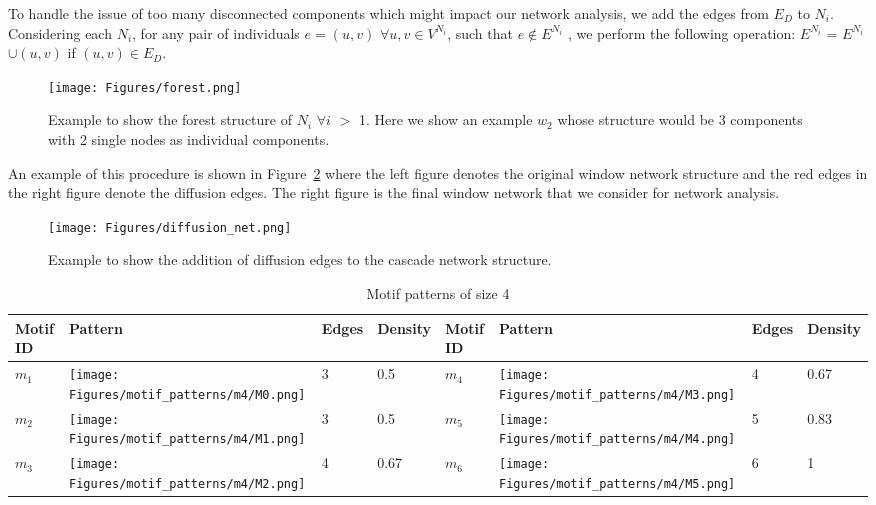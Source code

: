\documentclass[smallextended]{svjour3}       %
\theoremstyle{definition}
\begin{document}
To handle the issue of too many disconnected components which might impact our network analysis, we add the edges from $E_D$ to $N_i$. Considering each $N_i $, for any pair of individuals $e = (u, v)$  $\forall u, v \in V^{N_i}$,  such that $e \not \in E^{N_i}$ , we perform the following operation: $E^{N_i}$ = $E^{N_i}$ $\cup (u, v)$ if $(u, v) \in E_D$.

\begin{figure}[t!]
	\centering
	\texttt{[image: Figures/forest.png]}
	\caption{Example to show the forest structure of $N_i$ $\forall i$ $>$ 1. Here we show an example $w_2$ whose structure would be 3 components with 2 single nodes as individual components.}
	\label{fig:forest_windows}
\end{figure}

An example of this procedure is shown in Figure~\ref{fig:diff_edges} where the left figure denotes the original window network structure and the red edges in the right figure denote the diffusion edges. The right figure is the final window network that we consider for network analysis.

\begin{figure}[h!]
	\centering
	\texttt{[image: Figures/diffusion\_net.png]}
	\caption{Example to show the addition of diffusion edges to the cascade network structure.}
	\label{fig:diff_edges}
\end{figure}

\begin{table}[t!]
	\centering
	\caption{Motif patterns of size 4} \label{tab:motif_patterns_4}
	\begin{tabular}{|p{1.2cm}|p{2cm}|p{0.8cm}|p{1.2cm}|p{1.2cm}|p{2cm}|p{0.8cm}|p{1.2cm}|}
		\hline \textbf{Motif ID} & \textbf{Pattern} & \textbf{Edges} & \textbf{Density} & \textbf{Motif ID} & \textbf{Pattern} & \textbf{Edges} & \textbf{Density}\\
		\hline $m_1$ & \parbox[c]{1em}{
			\texttt{[image: Figures/motif\_patterns/m4/M0.png]}} & 3 & 0.5
		& $m_4$ & \parbox[c]{1em}{
			\texttt{[image: Figures/motif\_patterns/m4/M3.png]}} & 4 & 0.67
		\\
		\hline
		\hline $m_2$ & \parbox[c]{1em}{
			\texttt{[image: Figures/motif\_patterns/m4/M1.png]}} & 3 & 0.5 
		& $m_5$ & \parbox[c]{1em}{
			\texttt{[image: Figures/motif\_patterns/m4/M4.png]}} & 5 & 0.83
		\\
		\hline
		\hline $m_3$ & \parbox[c]{1em}{
			\texttt{[image: Figures/motif\_patterns/m4/M2.png]}} & 4 & 0.67 
		& $m_6$ & \parbox[c]{1em}{
			\texttt{[image: Figures/motif\_patterns/m4/M5.png]}} & 6 & 1
		\\
		\hline
	\end{tabular}
	\renewcommand{\arraystretch}{4}
\end{table}
\end{document}
